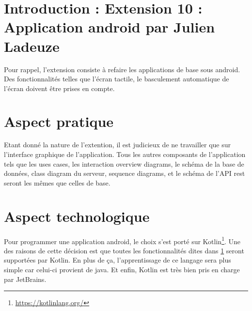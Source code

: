 \section{Introduction : Extension 10 : Application android par Julien Ladeuze}\label{INTRODUCTION}
\begin{flushleft}
Pour rappel, l'extension consiste à refaire les applications de base sous android. Des fonctionnalités telles que l'écran tactile, le basculement automatique de l'écran doivent être prises en compte.
\end{flushleft}
\section{Aspect pratique}
\begin{flushleft}
Etant donné la nature de l'extention, il est judicieux de ne travailler que sur l'interface graphique de l'application. Tous les autres composants de l'application tels que les uses cases, les interaction overview diagrams, le schéma de la base de données, class diagram du serveur, sequence diagrams, et le schéma de l'API rest seront les mêmes que celles de base.
\end{flushleft}
\section{Aspect technologique}
\begin{flushleft}
Pour programmer une application android, le choix s'est porté sur Kotlin\footnote{\url{https://kotlinlang.org/}}. Une des raisons de cette décision est que toutes les fonctionnalités dites dans \ref{INTRODUCTION} seront supportées par Kotlin. En plus de ça, l'apprentissage de ce langage sera plus simple car celui-ci provient de java. Et enfin, Kotlin est très bien pris en charge par JetBrains.
\end{flushleft}
